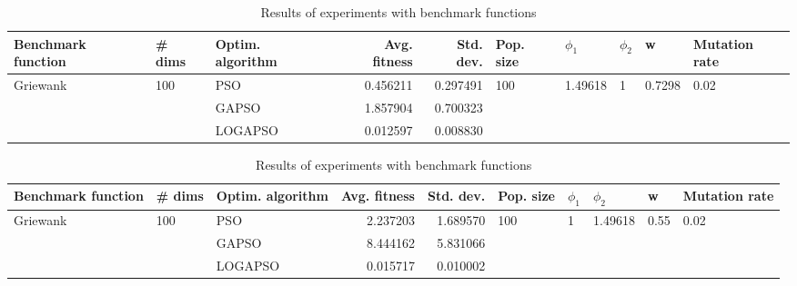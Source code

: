 \documentclass{article}
\begin{document}
\begin{table}
\centering
\caption{Results of experiments with benchmark functions}
\begin{tabular}{lllrrlllll}
\toprule
       Benchmark function &              \# dims & Optim. algorithm &  Avg. fitness &  Std. dev. &            Pop. size &               $\phi_{1}$ &         $\phi_{2}$ &                       w &         Mutation rate \\
\midrule
\multirow{3}{*}{Griewank} & \multirow{3}{*}{100} &              PSO &      0.456211 &   0.297491 & \multirow{3}{*}{100} & \multirow{3}{*}{1.49618} & \multirow{3}{*}{1} & \multirow{3}{*}{0.7298} & \multirow{3}{*}{0.02} \\
                          &                      &            GAPSO &      1.857904 &   0.700323 &                      &                          &                    &                         &                       \\
                          &                      &          LOGAPSO &      0.012597 &   0.008830 &                      &                          &                    &                         &                       \\
\bottomrule
\end{tabular}
\end{table}
\begin{table}
\centering
\caption{Results of experiments with benchmark functions}
\begin{tabular}{lllrrlllll}
\toprule
       Benchmark function &              \# dims & Optim. algorithm &  Avg. fitness &  Std. dev. &            Pop. size &         $\phi_{1}$ &               $\phi_{2}$ &                     w &         Mutation rate \\
\midrule
\multirow{3}{*}{Griewank} & \multirow{3}{*}{100} &              PSO &      2.237203 &   1.689570 & \multirow{3}{*}{100} & \multirow{3}{*}{1} & \multirow{3}{*}{1.49618} & \multirow{3}{*}{0.55} & \multirow{3}{*}{0.02} \\
                          &                      &            GAPSO &      8.444162 &   5.831066 &                      &                    &                          &                       &                       \\
                          &                      &          LOGAPSO &      0.015717 &   0.010002 &                      &                    &                          &                       &                       \\
\bottomrule
\end{tabular}
\end{table}
\end{document}

